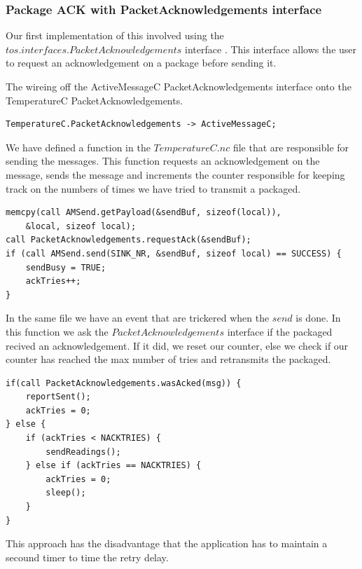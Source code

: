 \subsubsection{Package ACK with PacketAcknowledgements interface}

Our first implementation of this involved using the
$tos.interfaces.PacketAcknowledgements$ interface \cite{telosbAPI}. This
interface allows the user to request an acknowledgement on a package before
sending it.

The wireing off the ActiveMessageC PacketAcknowledgements interface onto the
TemperatureC PacketAcknowledgements.

\begin{lstlisting}[caption={TemperatureAppC.nc}]
 TemperatureC.PacketAcknowledgements -> ActiveMessageC;
\end{lstlisting}

We have defined a function in the $TemperatureC.nc$ file that are responsible
for sending the messages. This function requests an acknowledgement on the
message, sends the message and increments the counter responsible for keeping
track on the numbers of times we have tried to transmit a packaged.

\begin{lstlisting}[caption={TemperatureC.nc $\rightarrow$ sendReadings()}]
memcpy(call AMSend.getPayload(&sendBuf, sizeof(local)),
    &local, sizeof local);
call PacketAcknowledgements.requestAck(&sendBuf);
if (call AMSend.send(SINK_NR, &sendBuf, sizeof local) == SUCCESS) {
    sendBusy = TRUE;
    ackTries++;
}
\end{lstlisting}

In the same file we have an event that are trickered when the $send$ is done.
In this function we ask the $PacketAcknowledgements$ interface if the packaged
recived an acknowledgement. If it did, we reset our counter, else we check if
our counter has reached the max number of tries and retransmits the packaged.

\begin{lstlisting}[caption={TemperatureC.nc $\rightarrow$ AMSend.sendDone()}]
if(call PacketAcknowledgements.wasAcked(msg)) {
    reportSent();
    ackTries = 0;
} else {
    if (ackTries < NACKTRIES) {
        sendReadings();
    } else if (ackTries == NACKTRIES) {
        ackTries = 0;
        sleep();
    }
}
\end{lstlisting}

This approach has the disadvantage that the application has to maintain a
secound timer to time the retry delay.

